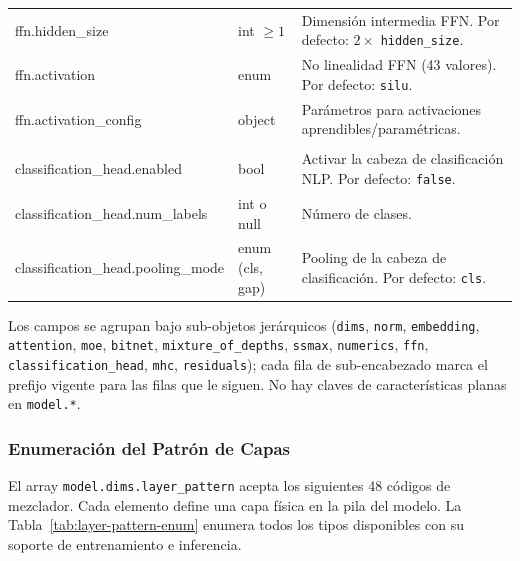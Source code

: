\begin{longtable}{>{\ttfamily\footnotesize\raggedright\arraybackslash}p{5.6cm}>{\raggedright\arraybackslash}p{2.4cm}>{\raggedright\arraybackslash}p{6.9cm}}
\midrule
\multicolumn{3}{l}{\textit{model.ffn.*}} \\
\midrule
ffn.hidden\_size & int $\ge 1$ & Dimensión intermedia FFN. Por defecto: $2\times$ \texttt{hidden\_size}. \\
ffn.activation & enum & No linealidad FFN (43 valores). Por defecto: \texttt{silu}. \\
ffn.activation\_config & object & Parámetros para activaciones aprendibles/paramétricas. \\
\midrule
\multicolumn{3}{l}{\textit{model.classification\_head.*}} \\
\midrule
classification\_head.enabled & bool & Activar la cabeza de clasificación NLP. Por defecto: \texttt{false}. \\
classification\_head.num\_labels & int o null & Número de clases. \\
classification\_head.pooling\_mode & enum (cls, gap) & Pooling de la cabeza de clasificación. Por defecto: \texttt{cls}. \\
\end{longtable}

Los campos se agrupan bajo sub-objetos jerárquicos (\texttt{dims}, \texttt{norm}, \texttt{embedding}, \texttt{attention}, \texttt{moe}, \texttt{bitnet}, \texttt{mixture\_of\_depths}, \texttt{ssmax}, \texttt{numerics}, \texttt{ffn}, \texttt{classification\_head}, \texttt{mhc}, \texttt{residuals}); cada fila de sub-encabezado marca el prefijo vigente para las filas que le siguen. No hay claves de características planas en \texttt{model.*}.

\subsubsection{Enumeración del Patrón de Capas}
\label{tab:layer-pattern}

El array \texttt{model.dims.layer\_pattern} acepta los siguientes 48 códigos de mezclador. Cada elemento define una capa física en la pila del modelo. La Tabla~\ref{tab:layer-pattern-enum} enumera todos los tipos disponibles con su soporte de entrenamiento e inferencia.

